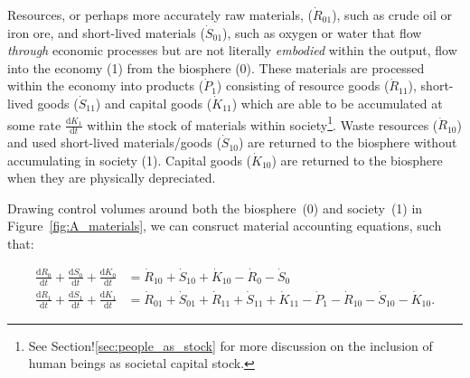 Resources, or perhaps more accurately raw materials, 
($\dot{R}_{01}$), such as crude oil or iron ore, 
and short-lived materials ($\dot{S}_{01}$), 
such as oxygen or water that flow \emph{through} economic
processes but are not literally \emph{embodied} within the output, 
flow into the economy (1) from the biosphere (0). 
These materials are processed within the economy into products ($\dot{P}_{1}$) 
consisting of resource goods ($\dot{R}_{11}$), 
short-lived goods ($\dot{S}_{11}$) and capital 
goods ($\dot{K}_{11}$)
which are able to be accumulated at some rate 
$\frac{\mathrm{d}K_{1}}{\mathrm{d}t}$ within the
stock of materials within society\footnote{See
Section!\ref{sec:people_as_stock} for more discussion on
the inclusion of human beings as societal capital stock.}.
Waste resources ($\dot{R}_{10}$) and used 
short-lived materials/goods ($\dot{S}_{10}$)
are returned to the biosphere without 
accumulating in society (1). 
Capital goods ($\dot{K}_{10}$) 
are returned to the biosphere 
when they are physically depreciated.

Drawing control volumes around both the 
biosphere~(0) and society~(1)
in Figure~\ref{fig:A_materials}, 
we can consruct material accounting equations,
such that:

\begin{align} \label{eq:A_CV_0}
	\frac{\mathrm{d}R_0}{\mathrm{d}t}		
	+	\frac{\mathrm{d}S_0}{\mathrm{d}t}
	+	\frac{\mathrm{d}K_0}{\mathrm{d}t}		&	
	=	\dot{R}_{10}		
	+	\dot{S}_{10}	
	+	\dot{K}_{10}											
	-	\dot{R}_{0}											
	-	\dot{S}_{0}								\\
\label{eq:A_CV_1}
	\frac{\mathrm{d}R_{1}}{\mathrm{d}t}
	+ \frac{\mathrm{d}S_{1}}{\mathrm{d}t}
	+ \frac{\mathrm{d}K_{1}}{\mathrm{d}t}		&
	= \dot{R}_{01} 
	+ \dot{S}_{01} 
	+ \dot{R}_{11}
	+ \dot{S}_{11}
	+ \dot{K}_{11}
	- \dot{P}_{1}				
	- \dot{R}_{10}				
	- \dot{S}_{10}				
	- \dot{K}_{10}.
\end{align}



